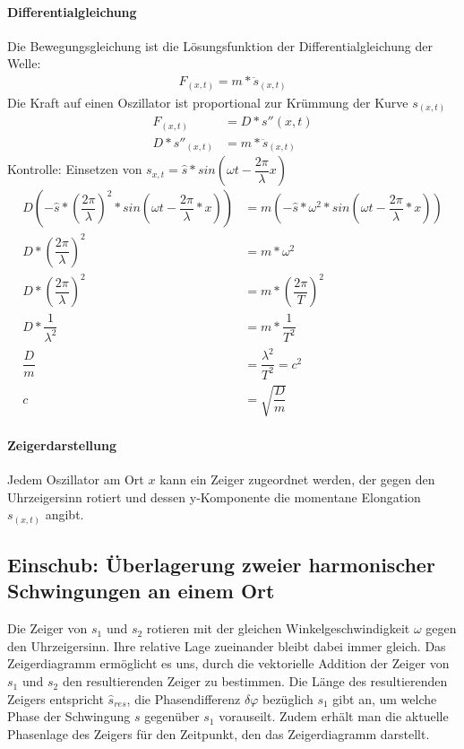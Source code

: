 \documentclass[12 pt]{article}
\numberwithin{equation}{section}
\begin{document}
	\paragraph{Differentialgleichung}Die Bewegungsgleichung ist die Lösungsfunktion der Differentialgleichung der Welle:
	\begin{align}
		F_{(x,t)}=m*\ddot{s}_{(x,t)}
	\end{align}
	Die Kraft auf einen Oszillator ist proportional zur Krümmung der Kurve $s_{(x,t)}$
	\begin{align}
		F_{(x,t)}&=D*s''(x,t)\\
		D*s''_{(x,t)}&=m*\ddot{s}_{(x,t)}
	\end{align}
	Kontrolle: Einsetzen von $s_{x,t}=\hat{s}*sin(\omega t-\dfrac{2\pi}{\lambda}x)$
	\begin{align}
		D\left( -\hat{s}*\left(\dfrac{2 \pi}{\lambda}\right)^2 *sin(\omega t-\dfrac{2 \pi}{\lambda}*x)\right) &=m\left(-\hat{s}*\omega^2*sin(\omega t-\dfrac{2 \pi}{\lambda}*x)\right)\nonumber\\
		D*\left(\dfrac{2 \pi}{\lambda}\right)^2&=m*\omega^2\\
		D*\left(\dfrac{2 \pi}{\lambda}\right)^2&=m*\left(\dfrac{2 \pi}{T}\right)^2\\
		D*\dfrac{1}{\lambda^2}&=m*\dfrac{1}{T^2}\\
		\dfrac{D}{m}&=\dfrac{\lambda^2}{T^2}=c^2\\
		c&=\sqrt{\dfrac{D}{m}}
	\end{align}
	\paragraph{Zeigerdarstellung}
	Jedem Oszillator am Ort $x$ kann ein Zeiger zugeordnet werden, der gegen den Uhrzeigersinn rotiert und dessen y-Komponente die momentane Elongation $s_{(x,t)}$ angibt.
	\subsection{Einschub: Überlagerung zweier harmonischer Schwingungen an einem Ort}
	Die Zeiger von $s_1$ und $s_2$ rotieren mit der gleichen Winkelgeschwindigkeit $\omega$ gegen den Uhrzeigersinn. Ihre relative Lage zueinander bleibt dabei immer gleich. Das Zeigerdiagramm ermöglicht es uns, durch die vektorielle Addition der Zeiger von $s_1$ und $s_2$ den resultierenden Zeiger zu bestimmen. Die Länge des resultierenden Zeigers entspricht $\hat{s}_{res}$, die Phasendifferenz $\delta \varphi$ bezüglich $s_1$ gibt an, um welche Phase der Schwingung $s$ gegenüber $s_1$ vorauseilt. Zudem erhält man die aktuelle Phasenlage des Zeigers für den Zeitpunkt, den das Zeigerdiagramm darstellt.
\end{document}
